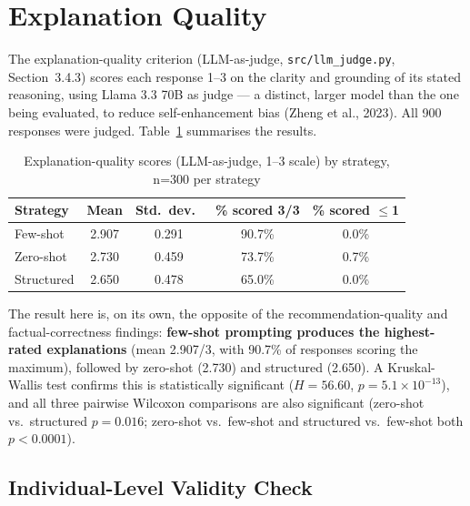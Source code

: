 \section{Explanation Quality}
\label{sec:explanation-consistency}

The explanation-quality criterion (LLM-as-judge, \texttt{src/llm\_judge.py}, Section~3.4.3) scores each response 1--3 on the clarity and grounding of its stated reasoning, using Llama 3.3 70B as judge --- a distinct, larger model than the one being evaluated, to reduce self-enhancement bias (Zheng et al., 2023). All 900 responses were judged. Table~\ref{tab:explanation-quality} summarises the results.

\begin{table}[htbp]
\centering
\caption{Explanation-quality scores (LLM-as-judge, 1--3 scale) by strategy, n=300 per strategy}
\label{tab:explanation-quality}
\begin{tabular}{lcccc}
\toprule
Strategy & Mean & Std.\ dev.\ & \% scored 3/3 & \% scored $\leq$1 \\
\midrule
Few-shot    & 2.907 & 0.291 & 90.7\% & 0.0\% \\
Zero-shot   & 2.730 & 0.459 & 73.7\% & 0.7\% \\
Structured  & 2.650 & 0.478 & 65.0\% & 0.0\% \\
\bottomrule
\end{tabular}
\end{table}

The result here is, on its own, the opposite of the recommendation-quality and factual-correctness findings: \textbf{few-shot prompting produces the highest-rated explanations} (mean 2.907/3, with 90.7\% of responses scoring the maximum), followed by zero-shot (2.730) and structured (2.650). A Kruskal-Wallis test confirms this is statistically significant ($H = 56.60$, $p = 5.1 \times 10^{-13}$), and all three pairwise Wilcoxon comparisons are also significant (zero-shot vs.\ structured $p = 0.016$; zero-shot vs.\ few-shot and structured vs.\ few-shot both $p < 0.0001$).

\subsection{Individual-Level Validity Check}
\label{sec:judge-validity}

